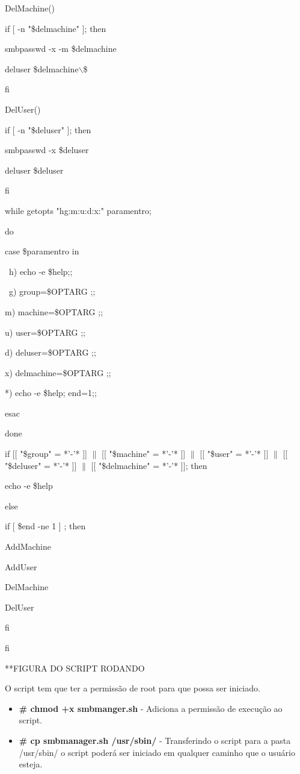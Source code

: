 DelMachine(){

if [ -n "\$delmachine" ]; then    

    smbpasswd -x -m \$delmachine

    deluser \$delmachine$\backslash$\$

fi

}

DelUser(){

if [ -n "\$deluser" ]; then    

    smbpasswd -x \$deluser

    deluser \$deluser

fi

}

while getopts "hg:m:u:d:x:" paramentro;

do

   case \$paramentro in

     \ h) echo -e \$help;;

     \ g) group=\$OPTARG ;;

      m) machine=\$OPTARG ;;

      u) user=\$OPTARG ;;

      d) deluser=\$OPTARG ;;

      x) delmachine=\$OPTARG ;;

      *) echo -e \$help; end=1;;

   esac

done

if [[ "\$group" = *'-'* ]] $\|$ [[ "\$machine" = *'-'* ]] $\|$ [[ "\$user" = *'-'* ]] $\|$ [[ "\$deluser" = *'-'* ]] $\|$ [[ "\$delmachine" = *'-'* ]]; then

    echo -e \$help

else

    if [ \$end -ne 1 ] ; then

        AddMachine

        AddUser

        DelMachine

        DelUser

    fi

fi

**FIGURA DO SCRIPT RODANDO

O script tem que ter a permissão de root para que possa ser iniciado.

\begin{itemize}
	\item \textbf{\# chmod +x smbmanger.sh} - Adiciona a permissão de execução ao script.
	\item \textbf{\# cp smbmanager.sh /usr/sbin/} - Transferindo o script para a pasta /usr/sbin/ o script poderá ser iniciado em qualquer caminho que o usuário esteja.
\end{itemize}

